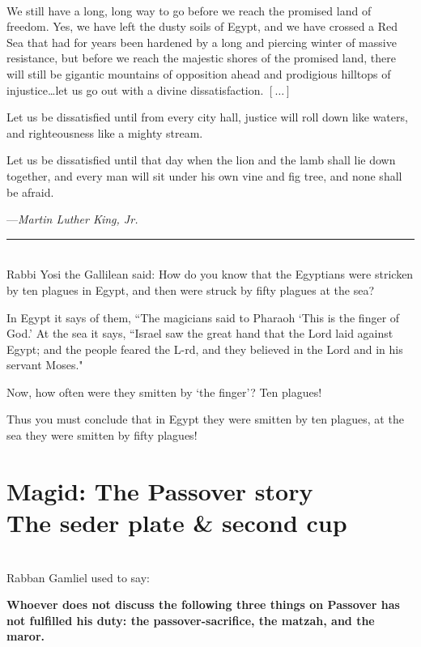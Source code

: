 \documentclass[a4paper,10pt,openany]{memoir}
\newcommand{\HgEllipsis}{\ensuremath{\left[\ldots\right]}}
\newcommand{\HgSource}[1]{\hfill{\small---\itshape{#1}}}
\newcommand{\HgHL}[1]{{\Large\textbf{#1}\par\noindent\\[-.5em]}}
\newcommand{\HgFill}{\vfill \hrule \vfill}
\newenvironment{HgEnglish}{\strut\\\noindent}{\vspace{1em}}
\newcommand{\LSrc}{\textsuperscript{\upshape{[L]}}}
\begin{document}
\begin{HgEnglish}
We still have a long, long way to go before we reach the promised land of
freedom. Yes, we have left the dusty soils of Egypt, and we have crossed a Red
Sea that had for years been hardened by a long and piercing winter of massive
resistance, but before we reach the majestic shores of the promised land, there
will still be gigantic mountains of opposition ahead and prodigious hilltops of
injustice\ldots{}let us go out with a divine dissatisfaction. \HgEllipsis

Let us be dissatisfied until from every city hall, justice will roll down like
waters, and righteousness like a mighty
stream.

Let us be dissatisfied until that day when the lion and the lamb shall lie down
together, and every man will sit under
his own vine and fig tree, and none shall be afraid.

\HgSource{Martin Luther King, Jr.}
\end{HgEnglish}

\HgFill

\begin{HgEnglish}
Rabbi Yosi the Gallilean said: How do you know that the Egyptians were stricken
by ten plagues in Egypt, and then were struck by fifty plagues at the sea?

In Egypt it says of them, ``The magicians said to Pharaoh `This is the finger of
God.' At the sea it says, ``Israel saw the great hand that the Lord laid against
Egypt; and the people feared the L-rd, and they believed in the Lord and in his
servant Moses."

Now, how often were they smitten by `the finger'? Ten plagues!

Thus you must conclude that in Egypt they were smitten by ten plagues, at the
sea they were smitten by fifty plagues! \LSrc

\end{HgEnglish}

\chapter*{Magid: The Passover story\\ {\LARGE The seder plate \& second cup}}
\vspace{-2em}

\begin{HgEnglish}
Rabban Gamliel used to say: \HgHL{Whoever does not discuss the following three
things on Passover has not fulfilled his duty: the passover-sacrifice, the
matzah, and the maror.}
\end{HgEnglish}
\end{document}
